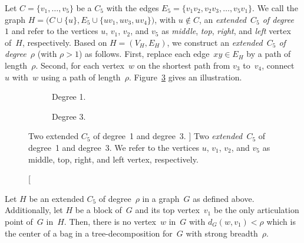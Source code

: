 Let $C = \{ v_1, \ldots, v_5 \}$ be a $C_5$ with the edges $E_5 = \{ v_1v_2, v_2v_3, \ldots, v_5v_1 \}$.
We call the graph $H = \big( C \cup \{ u \}, E_5 \cup \{ uv_1, uv_3, uv_4 \} \big)$, with $u \notin C$, an \emph{extended~\( C_5 \) of degree~\( 1 \)} and refer to the vertices $u$, $v_1$, $v_2$, and $v_5$ as \emph{middle}, \emph{top}, \emph{right}, and \emph{left} vertex of~$H$, respectively.
Based on $H = (V_H, E_H)$, we construct an \emph{extended~\( C_5 \) of degree~\( \rho \)} (with $\rho > 1$) as follows.
First, replace each edge~$xy \in E_H$ by a path of length~$\rho$.
Second, for each vertex~$w$ on the shortest path from $v_3$ to~$v_4$, connect $u$ with~$w$ using a path of length~$\rho$.
Figure~\ref{fig:extC5} gives an illustration.

\begin{figure}
    [htb]
    \centering
    \begin{subfigure}[b]{0.45\textwidth}
        \centering
        
        \caption
        {%
            Degree 1.
        }
        \label{fig:extC5deg1}
    \end{subfigure}
    \hfil
    \begin{subfigure}[b]{0.45\textwidth}
        \centering
        
        \caption
        {%
            Degree 3.
        }
        \label{fig:extC5deg3}
    \end{subfigure}

    \caption
    [%
        Two extended $C_5$ of degree~1 and degree~3.
    ]
    {%
        Two \emph{extended~\( C_5 \)} of \protect{} degree~1 and \protect{} degree~3.
        We refer to the vertices $u$, $v_1$, $v_2$, and $v_5$ as middle, top, right, and left vertex, respectively.
    }
    \label{fig:extC5}
\end{figure}

\begin{lemma}
    \label{lem:C5centers}
Let \( H \) be an extended \( C_5 \) of degree~\( \rho \) in a graph~\( G \) as defined above.
Additionally, let \( H \) be a block of~\( G \) and its top vertex~\( v_1 \) be the only articulation point of~\( G \) in~\( H \).
Then, there is no vertex~\( w \) in~\( G \) with \( d_G(w, v_1) < \rho \) which is the center of a bag in a tree-decomposition for~\( G \) with strong breadth~\( \rho \).
\end{lemma}

